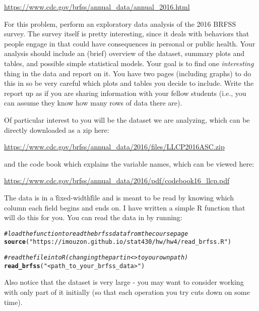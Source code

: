 \documentclass[11pt]{article}\usepackage[]{graphicx}\usepackage[]{color}
\makeatletter
\newcommand{\hlstr}[1]{\textcolor[rgb]{0.192,0.494,0.8}{#1}}%
\newcommand{\hlcom}[1]{\textcolor[rgb]{0.678,0.584,0.686}{\textit{#1}}}%
\newcommand{\hlstd}[1]{\textcolor[rgb]{0.345,0.345,0.345}{#1}}%
\newcommand{\hlkwd}[1]{\textcolor[rgb]{0.737,0.353,0.396}{\textbf{#1}}}%
\newenvironment{kframe}{%
 \def\at@end@of@kframe{}%
 \ifinner\ifhmode%
  \def\at@end@of@kframe{\end{minipage}}%
  \begin{minipage}{\columnwidth}%
 \fi\fi%
 \def\FrameCommand##1{\hskip\@totalleftmargin \hskip-\fboxsep
 \colorbox{shadecolor}{##1}\hskip-\fboxsep
     \hskip-\linewidth \hskip-\@totalleftmargin \hskip\columnwidth}%
 \MakeFramed {\advance\hsize-\width
   \@totalleftmargin\z@ \linewidth\hsize
   \@setminipage}}%
 {\par\unskip\endMakeFramed%
 \at@end@of@kframe}
\newenvironment{knitrout}{}{} %
\makeatother
\begin{document}
\begin{enumerate}
\url{https://www.cdc.gov/brfss/annual_data/annual_2016.html}

For this problem, perform an exploratory data analysis of the 2016 BRFSS survey. The survey itself is pretty interesting, since it deals with behaviors that people engage in that could have consequences in personal or public health. Your analysis should include an (brief) overview of the dataset, summary plots and tables, and possible simple statistical models. Your goal is to find one \textit{interesting} thing in the data and report on it. You have two pages (including graphs) to do this in so be very careful which plots and tables you decide to include. Write the report up as if you are sharing information with your fellow students (i.e., you can assume they know how many rows of data there are).

Of particular interest to you will be the dataset we are analyzing, which can be directly downloaded as a zip here:

\url{https://www.cdc.gov/brfss/annual_data/2016/files/LLCP2016ASC.zip}

and the code book which explains the variable names, which can be viewed here:

\url{https://www.cdc.gov/brfss/annual_data/2016/pdf/codebook16_llcp.pdf}

The data is in a \"fixed-width\" file and is meant to be read by knowing which column each field begins and ends on. I have written a simple R function that will do this for you. You can read the data in by running:

\begin{knitrout}
\color{fgcolor}\begin{kframe}
\begin{alltt}
\hlcom{# load the function to read the brfss data from the course page}
\hlkwd{source}\hlstd{(}\hlstr{"https://imouzon.github.io/stat430/hw/hw4/read_brfss.R"}\hlstd{)}

\hlcom{# read the file into R (changing the part in <> to your own path)}
\hlkwd{read_brfss}\hlstd{(}\hlstr{"<path_to_your_brfss_data>"}\hlstd{)}
\end{alltt}
\end{kframe}
\end{knitrout}

Also notice that the dataset is very large - you may want to consider working with only part of it initially (so that each operation you try cuts down on some time).

\end{enumerate}
\end{document}
